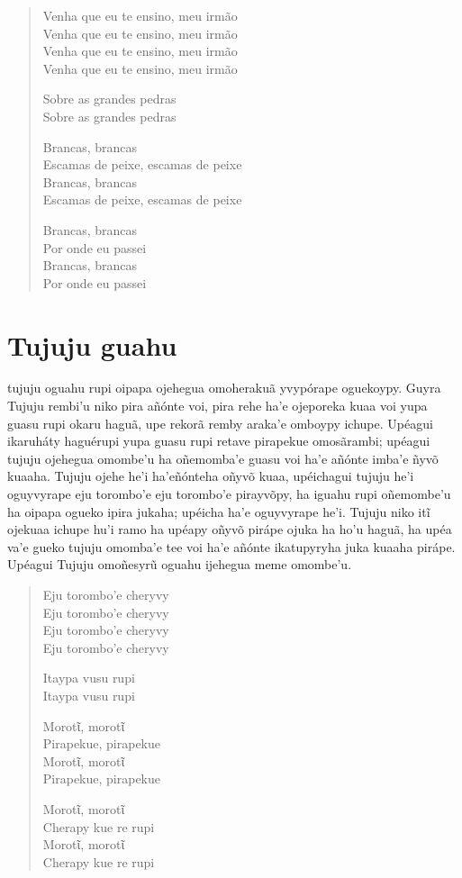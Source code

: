 \begin{verse}
Venha que eu te ensino, meu irmão\\
Venha que eu te ensino, meu irmão\\
Venha que eu te ensino, meu irmão\\
Venha que eu te ensino, meu irmão

Sobre as grandes pedras\\
Sobre as grandes pedras

Brancas, brancas\\
Escamas de peixe, escamas de peixe\\
Brancas, brancas\\
Escamas de peixe, escamas de peixe

Brancas, brancas\\
Por onde eu passei\\
Brancas, brancas\\
Por onde eu passei
\end{verse}

\chapter{Tujuju guahu}

 tujuju oguahu rupi oipapa ojehegua omoherakuã yvypórape oguekoypy.
Guyra Tujuju rembi'u niko pira añónte voi, pira rehe ha'e ojeporeka kuaa
voi yupa guasu rupi okaru haguã, upe rekorã remby araka'e omboypy
ichupe. Upéagui ikaruháty haguérupi yupa guasu rupi retave pirapekue
omosãrambi; upéagui tujuju ojehegua omombe'u ha oñemomba'e guasu voi
ha'e añónte imba'e ñyvõ kuaaha. Tujuju ojehe he’i ha’eñónteha oñyvõ kuaa, upéichagui tujuju he'i oguyvyrape eju torombo'e eju torombo'e
pirayvõpy, ha iguahu rupi oñemombe'u ha oipapa ogueko ipira jukaha;
upéicha ha'e oguyvyrape he'i. Tujuju niko itĩ ojekuaa ichupe hu'i ramo
ha upéapy oñyvõ pirápe ojuka ha ho'u haguã, ha upéa va'e gueko tujuju
omomba'e tee voi ha'e añónte ikatupyryha juka kuaaha pirápe. Upéagui
Tujuju omoñesyrũ oguahu ijehegua meme omombe'u.

\begin{verse}
Eju torombo'e cheryvy\\
Eju torombo'e cheryvy\\
Eju torombo'e cheryvy\\
Eju torombo'e cheryvy

Itaypa vusu rupi\\
Itaypa vusu rupi

Morotῖ, morotῖ\\
Pirapekue, pirapekue\\
Morotῖ, morotῖ\\
Pirapekue, pirapekue

\pagebreak
Morotῖ, morotῖ\\
Cherapy kue re rupi\\
Morotῖ, morotῖ\\
Cherapy kue re rupi
\end{verse}


